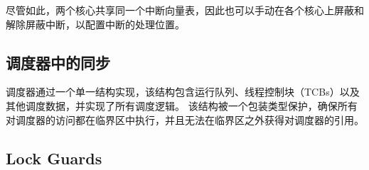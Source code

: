 尽管如此，两个核心共享同一个中断向量表，因此也可以手动在各个核心上屏蔽和解除屏蔽中断，以配置中断的处理位置。

\subsection{调度器中的同步}

调度器通过一个单一结构实现，该结构包含运行队列、线程控制块（TCBs）以及其他调度数据，并实现了所有调度逻辑。
该结构被一个包装类型保护，确保所有对调度器的访问都在临界区中执行，并且无法在临界区之外获得对调度器的引用。

\iffalse
\subsection{Lock Guards}

